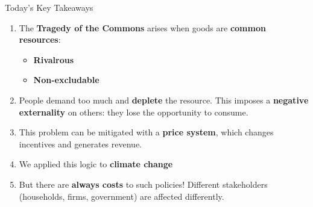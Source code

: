 \documentclass[9pt,english,aspectratio=169]{beamer}
\begin{document}
\begin{frame}{Today's Key Takeaways}

  \begin{enumerate}
    \item The \textbf{Tragedy of the Commons} arises when goods are \textbf{common resources}:
    \begin{itemize}
      \item \textbf{Rivalrous} 
      \item \textbf{Non-excludable}
    \end{itemize}
    \vspace{0.5em}
    \item People demand too much and \textbf{deplete} the resource.
    This imposes a \textbf{negative externality} on others: they lose the opportunity to consume.
    \vspace{0.5em}

    \item This problem can be mitigated with a \textbf{price system},
    which changes incentives and generates revenue.
    \vspace{0.5em}

    \item We applied this logic to \textbf{climate change}
    \vspace{0.5em}

    \item But there are \textbf{always costs} to such policies! Different stakeholders
    (households, firms, government) are affected differently.
  \end{enumerate}

\end{frame}
\end{document}
